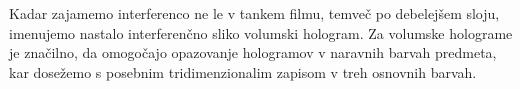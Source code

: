 \begin{remark}
Kadar zajamemo interferenco ne le v tankem filmu, temveč po debelejšem sloju, imenujemo 
nastalo interferenčno sliko volumski hologram. Za volumske holograme je značilno, da omogočajo 
opazovanje hologramov v naravnih barvah predmeta, kar dosežemo s posebnim tridimenzionalim zapisom 
v treh osnovnih barvah.
\end{remark}


